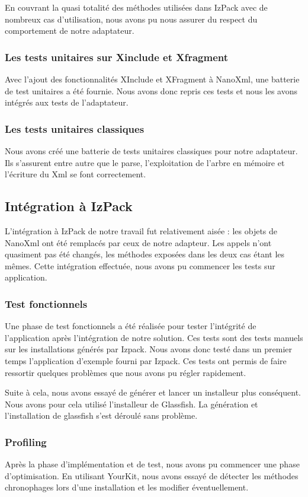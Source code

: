 En couvrant la quasi totalité des méthodes utilisées dans IzPack avec de nombreux cas d'utilisation, nous avons pu nous assurer du respect du comportement de notre adaptateur.
\subsubsection{Les tests unitaires sur Xinclude et Xfragment}
Avec l'ajout des fonctionnalités XInclude et XFragment à NanoXml, une batterie de test unitaires a été fournie.
Nous avons donc repris ces tests et nous les avons intégrés aux tests de l'adaptateur.
\subsubsection{Les tests unitaires classiques}
Nous avons créé une batterie de tests unitaires classiques pour notre adaptateur.
Ils s'assurent entre autre que le parse, l'exploitation de l'arbre en mémoire et l'écriture du Xml se font correctement.
\subsection{Intégration à IzPack}
L'intégration à IzPack de notre travail fut relativement aisée : les objets de NanoXml ont été remplacés par ceux de notre adapteur.
Les appels n'ont quasiment pas été changés, les méthodes exposées dans les deux cas étant les mêmes.
Cette intégration effectuée, nous avons pu commencer les tests sur application.
\subsubsection{Test fonctionnels}
Une phase de test fonctionnels a été réalisée pour tester l'intégrité de l'application après l'intégration de notre solution.
Ces tests sont des tests manuels sur les installations générés par Izpack.
Nous avons donc testé dans un premier temps l'application d'exemple fourni par Izpack.
Ces tests ont permis de faire ressortir quelques problèmes que nous avons pu régler rapidement.

Suite à cela, nous avons essayé de générer et lancer un installeur plus conséquent.
Nous avons pour cela utilisé l'installeur de Glassfish.
La génération et l'installation de glassfish s'est déroulé sans problème.
\subsubsection{Profiling}
Après la phase d'implémentation et de test, nous avons pu commencer une phase d'optimisation.
En utilisant YourKit, nous avons essayé de détecter les méthodes chronophages lors d'une installation et les modifier éventuellement.

